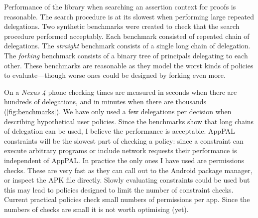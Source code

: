 \documentclass[a4paper]{scrartcl}
\begin{document}
Performance of the library when searching an assertion context for proofs is reasonable.
The search procedure is at its slowest when performing large repeated delegations.
Two synthetic benchmarks were created to check that the search procedure performed acceptably.
Each benchmark consisted of repeated chain of delegations.
The \emph{straight} benchmark consists of a single long chain of delegation.
The \emph{forking} benchmark consists of a binary tree of principals delegating to each other.
These benchmarks are reasonable as they model the worst kinds of policies to evaluate---though worse ones could be designed by forking even more.

On a \emph{Nexus 4} phone checking times are measured in seconds when there are hundreds of delegations, and in minutes when there are thousands (\autoref{fig:benchmarks}).
We have only used a few delegations per decision when describing hypothetical user policies.
Since the benchmarks show that long chains of delegation can be used, I believe the performance is acceptable.
AppPAL constraints will be the slowest part of checking a policy:
  since a constraint can execute arbitrary programs or include network requests their performance is independent of AppPAL.
In practice the only ones I have used are permissions checks.
These are very fast as they can call out to the Android package manager, or inspect the APK file directly.
Slowly evaluating constraints could be used but this may lead to policies designed to limit the number of constraint checks.
Current practical policies check small numbers of permissions per app.
Since the numbers of checks are small it is not worth optimising (yet).
\end{document}
